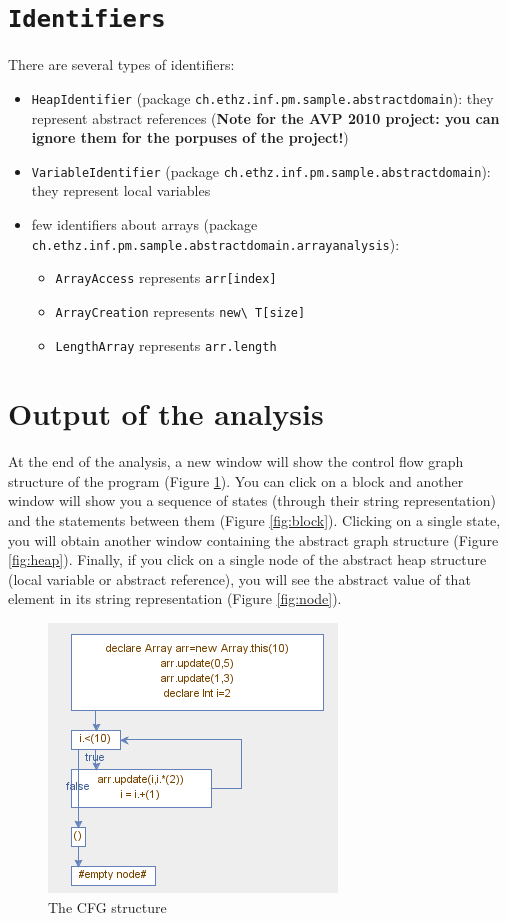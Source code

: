 \documentclass[11pt]{article}
\newcommand{\avp}[1]{\textbf{Note for the AVP 2010 project: #1}}
\newcommand{\statement}[1]{\lstinline{#1}}
\begin{document}
\section{\statement{Identifiers}}
There are several types of identifiers:
\begin{itemize}
\item \statement{HeapIdentifier} (package \statement{ch.ethz.inf.pm.sample.abstractdomain}): they represent abstract references (\avp{you can ignore them for the porpuses of the project!})
\item \statement{VariableIdentifier} (package \statement{ch.ethz.inf.pm.sample.abstractdomain}): they represent local variables
\item few identifiers about arrays (package \statement{ch.ethz.inf.pm.sample.abstractdomain.arrayanalysis}):
\begin{itemize}
\item \statement{ArrayAccess} represents \statement{arr[index]}
\item \statement{ArrayCreation} represents \statement{new\ T[size]}
\item \statement{LengthArray} represents \statement{arr.length}
\end{itemize}
\end{itemize}

\section{Output of the analysis}
At the end of the analysis, a new window will show the control flow graph structure of the program (Figure \ref{fig:cfg}). You can click on a block and another window will show you a sequence of states (through their string representation) and the statements between them (Figure \ref{fig:block}). Clicking on a single state, you will obtain another window containing the abstract graph structure (Figure \ref{fig:heap}). Finally, if you click on a single node of the abstract heap structure (local variable or abstract reference), you will see the abstract value of that element in its string representation (Figure \ref{fig:node}).


\begin{figure}
\centering
\includegraphics{cfg.png}
\caption{The CFG structure}
\label{fig:cfg}
\end{figure}
\end{document}
